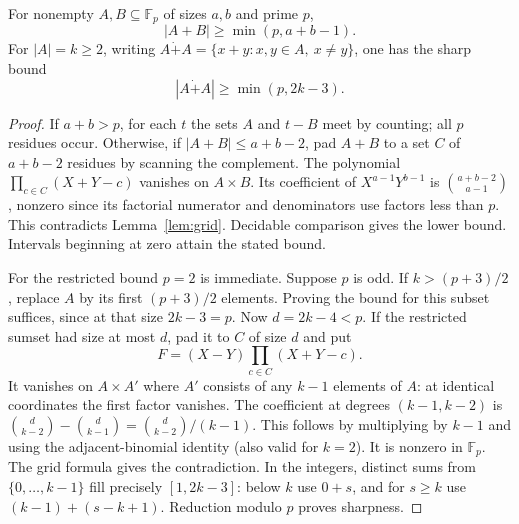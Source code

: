 \begin{theorem}\label{result61}
For nonempty $A,B\subseteq\mathbb F_p$ of sizes $a,b$ and prime $p$,
\[
 |A+B|\ge\min(p,a+b-1).
\]
For $|A|=k\ge2$, writing $A\mathbin{\dot+}A=\{x+y:x,y\in A,\ x\ne y\}$, one has the sharp bound
\[
 |A\mathbin{\dot+} A|\ge\min(p,2k-3).
\]
\end{theorem}
\begin{proof}
If $a+b>p$, for each $t$ the sets $A$ and $t-B$ meet by counting; all $p$ residues occur. Otherwise, if $|A+B|\le a+b-2$, pad $A+B$ to a set $C$ of $a+b-2$ residues by scanning the complement. The polynomial $\prod_{c\in C}(X+Y-c)$ vanishes on $A\times B$. Its coefficient of $X^{a-1}Y^{b-1}$ is $\binom{a+b-2}{a-1}$, nonzero since its factorial numerator and denominators use factors less than $p$. This contradicts Lemma~\ref{lem:grid}. Decidable comparison gives the lower bound. Intervals beginning at zero attain the stated bound.

For the restricted bound $p=2$ is immediate. Suppose $p$ is odd. If $k>(p+3)/2$, replace $A$ by its first $(p+3)/2$ elements. Proving the bound for this subset suffices, since at that size $2k-3=p$. Now $d=2k-4<p$. If the restricted sumset had size at most $d$, pad it to $C$ of size $d$ and put
\[
 F=(X-Y)\prod_{c\in C}(X+Y-c).
\]
It vanishes on $A\times A'$ where $A'$ consists of any $k-1$ elements of $A$: at identical coordinates the first factor vanishes. The coefficient at degrees $(k-1,k-2)$ is
$\binom{d}{k-2}-\binom{d}{k-1}=\binom{d}{k-2}/(k-1)$. This follows by multiplying by $k-1$ and using the adjacent-binomial identity (also valid for $k=2$). It is nonzero in $\mathbb F_p$. The grid formula gives the contradiction. In the integers, distinct sums from $\{0,\ldots,k-1\}$ fill precisely $[1,2k-3]$: below $k$ use $0+s$, and for $s\ge k$ use $(k-1)+(s-k+1)$. Reduction modulo $p$ proves sharpness.
\end{proof}

